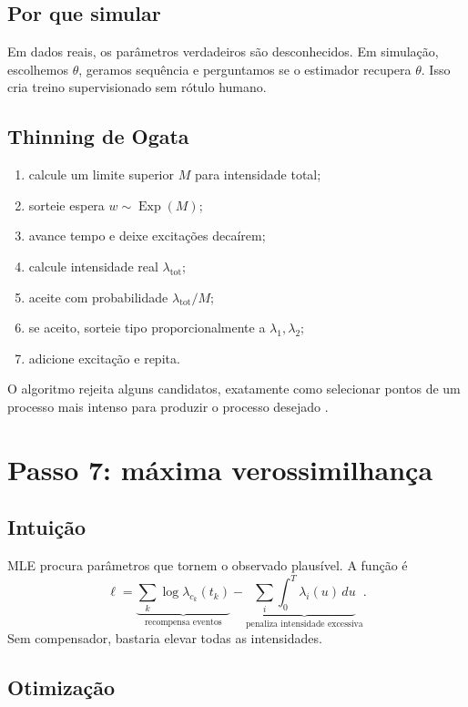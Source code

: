 \documentclass[12pt,a4paper,openany]{report}
\begin{document}
\section{Por que simular}

Em dados reais, os parâmetros verdadeiros são desconhecidos. Em simulação, escolhemos
\(\theta\), geramos sequência e perguntamos se o estimador recupera \(\theta\). Isso cria
treino supervisionado sem rótulo humano.

\section{Thinning de Ogata}

\begin{enumerate}
  \item calcule um limite superior \(M\) para intensidade total;
  \item sorteie espera \(w\sim\operatorname{Exp}(M)\);
  \item avance tempo e deixe excitações decaírem;
  \item calcule intensidade real \(\lambda_{\mathrm{tot}}\);
  \item aceite com probabilidade \(\lambda_{\mathrm{tot}}/M\);
  \item se aceito, sorteie tipo proporcionalmente a \(\lambda_1,\lambda_2\);
  \item adicione excitação e repita.
\end{enumerate}

O algoritmo rejeita alguns candidatos, exatamente como selecionar pontos de um processo
mais intenso para produzir o processo desejado \citep{ogata1981}.

\chapter{Passo 7: máxima verossimilhança}

\section{Intuição}

MLE procura parâmetros que tornem o observado plausível. A função é
\[
\ell=\underbrace{\sum_k\log\lambda_{c_k}(t_k)}_{\text{recompensa eventos}}
-\underbrace{\sum_i\int_0^T\lambda_i(u)\,du}_{\text{penaliza intensidade excessiva}}.
\]
Sem compensador, bastaria elevar todas as intensidades.

\section{Otimização}
\end{document}
